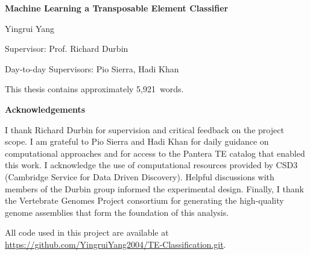 \documentclass[12pt]{article}
\newcommand\wordcount{5,921}
\begin{document}
\begin{titlepage}
    \centering
    \vspace*{2cm}
    
    {\LARGE\bfseries Machine Learning a Transposable Element Classifier\par}
    
    \vspace{3cm}
    
    {\Large Yingrui Yang\par}
    
    \vspace{3cm}
    
    {\large 
    Supervisor: Prof. Richard Durbin\par
    \vspace{0.5cm}
    Day-to-day Supervisors: Pio Sierra, Hadi Khan\par
    }
    
    \vfill
    
    {\normalsize This thesis contains approximately \wordcount\ words.\par}
    
    \vspace{1.5cm}

    \begin{flushleft}
    {\normalsize\bfseries Acknowledgements\par}
    \vspace{0.3cm}
    {\small I thank Richard Durbin for supervision and critical feedback on the project scope. I am grateful to Pio Sierra and Hadi Khan for daily guidance on computational approaches and for access to the Pantera TE catalog that enabled this work. I acknowledge the use of computational resources provided by CSD3 (Cambridge Service for Data Driven Discovery). Helpful discussions with members of the Durbin group informed the experimental design. Finally, I thank the Vertebrate Genomes Project consortium for generating the high-quality genome assemblies that form the foundation of this analysis.\par
    
    \small All code used in this project are available at \url{https://github.com/YingruiYang2004/TE-Classification.git}. \par}
    \end{flushleft}

    \vspace{1cm}
    
\end{titlepage}
\end{document}

